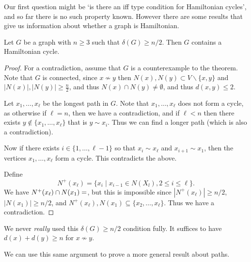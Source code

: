 \begin{center}

\end{center}


Our first question might be `is there an iff type condition for Hamiltonian cycles', and so far there is no such property known. However there are some results that give us information about whether a graph is Hamiltonian.

\begin{theorem}
	Let $G$ be a graph with $n\geq 3$ such that $\delta(G) \geq n/2$. Then $G$ contains a Hamiltonian cycle.
\end{theorem}
\begin{proof}
	For a contradiction, assume that $G$ is a counterexample to the theorem.
	Note that $G$ is connected, since $x \not \sim y$ then $N(x), N(y) \subset V \backslash\{x, y\}$ and $|N(x)|, |N(y)| \geq \frac{n}{2}$, and thus $N(x) \cap N(y) \neq \emptyset$, and thus $d(x, y) \leq 2$.

	Let $x_1, \dots, x_\ell$ be the longest path in $G$. Note that $x_1, \dots, x_\ell$ does not form a cycle, as otherwise if $\ell = n$, then we have a contradiction, and if $\ell < n$ then there exists $y \not \in \{x_1, \dots, x_\ell\}$ that is $y \sim x_i$. Thus we can find a longer path (which is also a contradiction).

	Now if there exists $i \in \{1, \dots, \ell - 1\}$ so that $x_i \sim x_\ell$ and $x_{i + 1} \sim x_1$, then the vertices $x_1, \dots, x_\ell$ form a cycle. This contradicts the above.

	Define
	$$
	N^+(x_\ell) = \{x_i \mid x_{i - 1} \in N(X_l), 2 \leq i \leq \ell\}.
	$$
	We have $N^+(x_\ell) \cap N(x_1) = \empty$, but this is impossible since $|N^+(x_\ell)| \geq n/2$, $|N(x_1)| \geq n/2$, and $N^+(x_\ell), N(x_1) \subseteq \{x_2, \dots, x_\ell\}$. Thus we have a contradiction.
\end{proof}

\begin{remark}
	We never \emph{really} used this $\delta(G) \geq n/2$ condition fully. It suffices to have $d(x) + d(y) \geq n$ for $x \not \sim y$.
\end{remark}

We can use this same argument to prove a more general result about paths.

